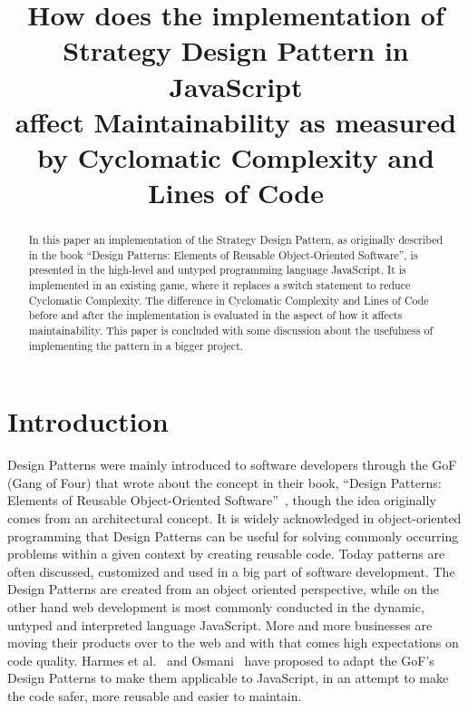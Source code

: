 \documentclass[conference, a4paper]{IEEEtran}
\begin{document}
\title{How does the implementation of\\
Strategy Design Pattern in JavaScript\\
affect Maintainability as measured by Cyclomatic Complexity and Lines of Code}
\author{
}

\maketitle

\begin{abstract}
	 In this paper an implementation of the Strategy Design Pattern, as originally described in the book ``Design Patterns: Elements of Reusable Object-Oriented Software'', is presented in the high-level and untyped programming language JavaScript. It is implemented in an existing game, where it replaces a switch statement to reduce Cyclomatic Complexity. The difference in Cyclomatic Complexity and Lines of Code before and after the implementation is evaluated in the aspect of how it affects maintainability. This paper is concluded with some discussion about the usefulness of implementing the pattern in a bigger project.
\end{abstract}

\section{Introduction}
\label{sec:Introduction}
Design Patterns were mainly introduced to software developers through the GoF (Gang of Four) that wrote about the concept in their book, ``Design Patterns: Elements of Reusable Object-Oriented Software''~\cite{bibitem:GoF}, though the idea originally comes from an architectural concept. It is widely acknowledged in object-oriented programming that Design Patterns can be useful for solving commonly occurring problems within a given context  by creating reusable code. Today patterns are often discussed, customized and used in a big part of software development.
The Design Patterns are created from an object oriented perspective, while on the other hand web development is most commonly conducted in the dynamic, untyped and interpreted language JavaScript. More and more businesses are moving their products over to the web and with that comes high expectations on code quality. Harmes et al.~\cite{bibitem:DiazHarmes} and Osmani~\cite{bibitem:Osmani} have proposed to adapt the GoF's Design Patterns to make them applicable to JavaScript, in an attempt to make the code safer, more reusable and easier to maintain.
\end{document}
